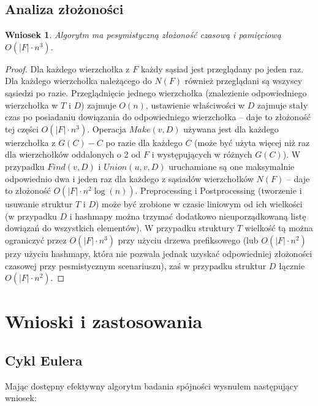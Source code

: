\documentclass{pracamgr}
\newtheorem{corollary}[theorem]{Wniosek}
\begin{document}
   \subsection{Analiza złożoności}
    \begin{corollary}\label{zlozonosc lokalnej spojnosci}
     Algorytm ma pesymistyczną złożoność czasową i pamięciową $O(|F|\cdot n^3)$.
    \end{corollary}
    \begin{proof}
     Dla każdego wierzchołka z $F$ każdy sąsiad jest przeglądany po jeden raz.
     Dla każdego wierzchołka należącego do $N(F)$ również przeglądani są wszyscy sąsiedzi
     po razie. Przeglądnięcie jednego wierzchołka (znalezienie odpowiedniego wierzchołka w $T$ i $D$) zajmuje $O(n)$,
     ustawienie właściwości w $D$ zajmuje stały czas po posiadaniu dowiązania do odpowiedniego wierzchołka -- daje to złożoność tej części $O(|F|\cdot n^3)$.\newline
     Operacja $Make(v,D)$ używana jest dla każdego wierzchołka z $G(C)-C$ po razie dla każdego $C$
     (może być użyta więcej niż raz dla wierzchołków oddalonych o 2 od $F$ i występujących w różnych $G(C)$).
     W przypadku $Find(v,D)$ i $Union(u,v,D)$ uruchamiane są one maksymalnie odpowiednio dwa i jeden raz dla każdego z sąsiadów wierzchołków $N(F)$
     -- daje to złożoność $O(|F|\cdot n^2\log(n))$.\newline
     Preprocessing i Postprocessing (tworzenie i usuwanie struktur $T$ i $D$)
     może być zrobione w czasie liniowym od ich wielkości (w przypadku $D$ i hashmapy można trzymać dodatkowo nieuporządkowaną listę dowiązań do wszystkich
     elementów). W przypadku struktury $T$ wielkość tą można ograniczyć przez $O(|F|\cdot n^3)$ przy użyciu drzewa prefiksowego
     (lub $O(|F|\cdot n^2)$ przy użyciu hashmapy, która nie pozwala jednak uzyskać odpowiedniej złożoności czasowej przy pesmistycznym scenariuszu),
     zaś w przypadku struktur $D$ łącznie $O(|F|\cdot n^2)$.
    \end{proof}
  \section{Wnioski i zastosowania}
   \subsection{Cykl Eulera}
    Mając dostępny efektywny algorytm badania spójności wysnułem następujący wniosek: 
 
\end{document}
